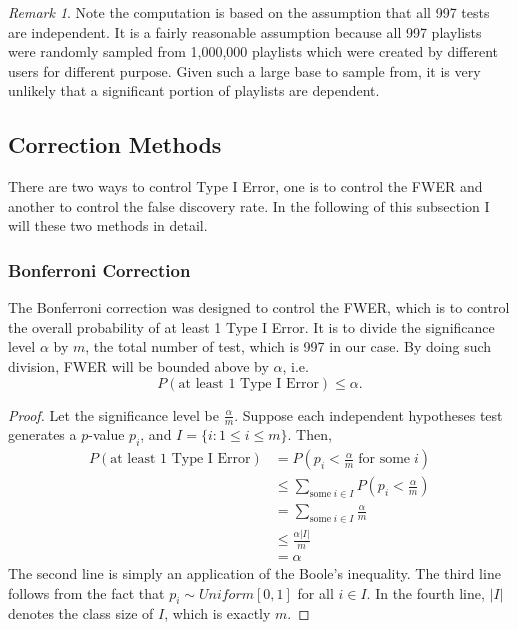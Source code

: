 \documentclass[12pt]{article}
\theoremstyle{plain}
\theoremstyle{definition}
\theoremstyle{remark}
\newtheorem*{remark}{Remark}
\begin{document}
\begin{remark}
Note the computation is based on the assumption that all 997 tests are independent. It is a fairly reasonable assumption because all 997 playlists were randomly sampled from 1,000,000 playlists which were created by different users for different purpose. Given such a large base to sample from, it is very unlikely that a significant portion of playlists are dependent.
\end{remark}

\newpage
\subsection{Correction Methods}
There are two ways to control Type I Error, one is to control the FWER and another to control the false discovery rate. In the following of this subsection I will these two methods in detail.

\subsubsection{Bonferroni Correction}
The Bonferroni correction was designed to control the FWER, which is to control the overall probability of at least 1 Type I Error. It is to divide the significance level $\alpha$ by $m$, the total number of test, which is 997 in our case. By doing such division, FWER will be bounded above by $\alpha$, i.e. 
\[P(\text{at least 1 Type I Error})\leq \alpha.\]

\begin{proof}\cite{5.3}
Let the significance level be $\frac{\alpha}{m}$. Suppose each independent hypotheses test generates a $p$-value $p_i$, and $I=\{i:1\leq i\leq m\}$. Then,
\begin{align*}
    P(\text{at least 1 Type I Error})&=P(p_i<\frac{\alpha}{m}\; \text{for some} \;i)\\
    &\leq\sum_{\text{some}\; i\in I} P(p_i<\frac{\alpha}{m})\\
    &=\sum_{\text{some}\; i\in I}\frac{\alpha}{m}\\
    &\leq\frac{\alpha|I|}{m}\\
    &=\alpha
\end{align*}
The second line is simply an application of the Boole's inequality. The third line follows from the fact that $p_i\sim Uniform[0,1]$ for all $i\in I$. In the fourth line, $|I|$ denotes the class size of $I$, which is exactly $m$. 
\end{proof}
\end{document}
